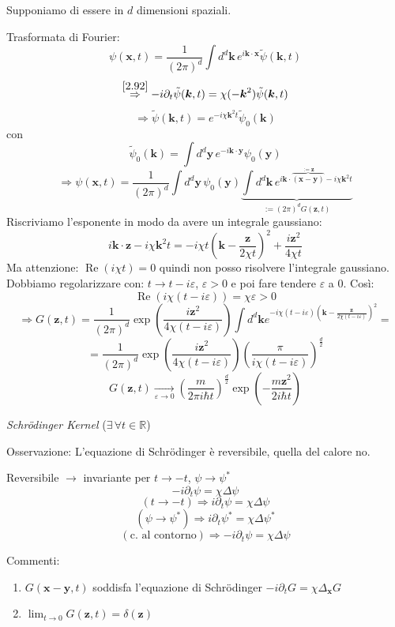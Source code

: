 \documentclass[a4paper,11pt]{report}
\newcommand{\vect}[1]{\boldsymbol{#1}}
\newcommand{\R}{\mathbb{R}}
\newcommand{\x}{\boldsymbol{x}}
\newcommand{\y}{\boldsymbol{y}}
\newcommand{\kk}{\boldsymbol{k}}
\newcommand{\z}{\boldsymbol{z}}
\begin{document}
Supponiamo di essere in $d$ dimensioni spaziali. 

Trasformata di Fourier:
\[
\psi(\x,t)=\frac{1}{(2\pi)^d}\int d^d\kk\, e^{i\kk\cdot \x}\tilde{\psi}(\kk,t)
\]
\[
\overset{\eqref{2.92}}{\Rightarrow} -i\partial_t \tilde{\psi}(\kk,t)=\chi (-\kk ^2)\tilde{\psi}(\kk,t)
\]
\[
\Rightarrow \tilde{\psi}(\kk,t) = e^{-i\chi\kk^2 t}\tilde{\psi}_0(\kk)
\]
con
\[
\tilde{\psi}_0(\kk)=\int d^d \y\, e^{-i\kk\cdot \y} \psi_0(\y)
\]
\[
\Rightarrow \psi(\x,t) = \frac{1}{(2\pi)^d}\int d^d \y\, \psi_0(\y) \underbrace{\int d^d\kk\, e^{i\kk \cdot \overbrace{\scriptstyle(\x-\y)}^{:=\vect{z}} - i\chi \kk^2 t}}_{:=(2\pi)^d G(\z,t)}
\]
Riscriviamo l'esponente in modo da avere un integrale gaussiano:
\[
i\kk \cdot \z - i \chi \kk^2 t = -i\chi t\left(\kk - \frac{\z}{2\chi t}\right)^2 + \frac{i\z^2}{4\chi t}
\]
Ma attenzione: $\operatorname{Re}(i\chi t)=0$ quindi non posso risolvere l'integrale gaussiano. Dobbiamo regolarizzare con: $t\rightarrow t-i\varepsilon$, $\varepsilon>0$ e poi fare tendere $\varepsilon$ a 0. Cos\`i:
\[
\operatorname{Re}(i\chi(t-i\varepsilon))=\chi\varepsilon >0
\]
\[
\Rightarrow G(\z,t)=\frac{1}{(2\pi)^d}\exp \left(\frac{i\z^2}{4\chi(t-i\varepsilon)}\right) \int d^d\kk e^{-i\chi(t-i\varepsilon)\left( \kk -\frac{\z}{2\chi(t-i\varepsilon)}\right)^2}=
\]
\[
=\frac{1}{(2\pi)^d}\exp\left(\frac{i\z^2}{4\chi(t-i\varepsilon)}\right) \left( \frac{\pi}{i\chi(t-i\varepsilon)} \right)^\frac{d}{2}
\]
\begin{equation}
G(\z,t)\underset{\varepsilon \to 0}{\rightarrow} \left(\frac{m}{2\pi i \hbar t}\right)^{\frac{d}{2}}\exp \left(-\frac{m\z^2}{2i\hbar t}  \right)
\label{2.93}
\end{equation}
\centerline{\emph{Schr\"odinger Kernel} ($\exists\, \forall t\in \R$)}

\smallskip

Osservazione: L'equazione di Schr\"odinger \`e reversibile, quella del calore no.

Reversibile $\rightarrow$ invariante per $t \to -t$, $\psi \to \psi^*$
\[
-i\partial_t \psi =\chi \Delta \psi
\]
\[
(t\to -t)\Rightarrow i\partial_t\psi=\chi\Delta \psi
\]
\[
(\psi \to \psi^*)\Rightarrow i\partial_t\psi^*=\chi\Delta \psi^*
\]
\[
(\text{c. al contorno})\Rightarrow -i\partial_t\psi=\chi\Delta\psi
\]

Commenti:
\begin{enumerate}[label=(\roman*)]
\item $G(\x-\y,t)$ soddisfa l'equazione di Schr\"odinger $-i\partial_t G = \chi \Delta_{\x}G$
\item $\lim_{t\to 0} G(\z,t)=\delta(\z)$
\end{enumerate}
\end{document}
